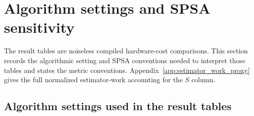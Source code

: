 \documentclass[
  reprint,
  amsmath,
  amssymb,
  aps,
  pra,
  nofootinbib,
  superscriptaddress,
  floatfix
]{revtex4-2}
\begin{document}
\section{Algorithm settings and SPSA sensitivity}
\label{app:results_discussion}

The result tables are noiseless compiled hardware-cost comparisons. This section
records the algorithmic setting and SPSA conventions needed to interpret those tables and
states the metric conventions. Appendix~\ref{app:estimator_work_proxy} gives the
full normalized estimator-work accounting for the \(S\) column.

\subsection{Algorithm settings used in the result tables}
\end{document}
